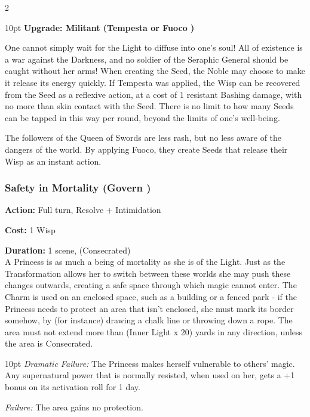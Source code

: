 \begin{multicols}{2}
\begin{myindentpar}{10pt}
\textbf{Upgrade: Militant (Tempesta \textbullet\textbullet or Fuoco \textbullet\textbullet\textbullet)}

One cannot simply wait for the Light to diffuse into one's soul! All of existence is a war against the Darkness, and no soldier of the Seraphic General should be caught without her arms! When creating the Seed, the Noble may choose to make it release its energy quickly. If Tempesta was applied, the Wisp can be recovered from the Seed as a reflexive action, at a cost of 1 resistant Bashing  damage, with no more than skin contact with the Seed. There is no limit to how many Seeds can be tapped in this way per round, beyond the limits of one's well-being.

The followers of the Queen of Swords are less rash, but no less aware of the dangers of the world. By applying Fuoco, they create Seeds that release their Wisp as an instant action.\end{myindentpar}

\subsubsection*{Safety in Mortality (Govern \textbullet\textbullet)}

\noindent \textbf{Action:} Full turn, Resolve + Intimidation

\noindent \textbf{Cost:} 1 Wisp

\noindent \textbf{Duration:} 1 scene, (Consecrated) \\

\noindent A Princess is as much a being of mortality as she is of the Light. Just as the Transformation allows her to switch between these worlds she may push these changes outwards, creating a safe space through which magic cannot enter. The Charm is used on an enclosed space, such as a building or a fenced park - if the Princess needs to protect an area that isn't enclosed, she must mark its border somehow, by (for instance) drawing a chalk line or throwing down a rope. The area must not extend more than (Inner Light x 20) yards in any direction, unless the area is Consecrated.

\begin{myindentpar}{10pt}    \emph{Dramatic Failure:} The Princess makes herself vulnerable to others' magic. Any supernatural power that is normally resisted, when used on her, gets a +1 bonus on its activation roll for 1 day.

    \emph{Failure:} The area gains no protection.


\end{myindentpar}
\end{multicols}

